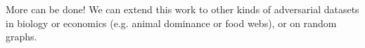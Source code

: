 \documentclass[preview]{standalone}
\begin{document}
More can be done! We can extend this work to other kinds of adversarial datasets in biology or economics (e.g. animal dominance or food webs), or on random graphs.\\
\end{document}
